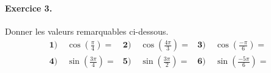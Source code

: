 \documentclass[11pt]{article}
\begin{document}
\paragraph{Exercice 3.} Donner les valeurs remarquables ci-dessous.
\begin{align*}
  \textbf{1)}\; & \cos\left( \frac{\pi}{4} \right) = &
  \textbf{2)}\; & \cos\left( \frac{4\pi}{3} \right) = &
  \textbf{3)}\; & \cos\left( \frac{-\pi}{6} \right) = \\
  \textbf{4)}\; & \sin\left( \frac{3\pi}{4} \right) = &
  \textbf{5)}\; & \sin\left( \frac{3\pi}{2} \right) = &
  \textbf{6)}\; & \sin\left( \frac{-5\pi}{6} \right) =
\end{align*}
\end{document}
